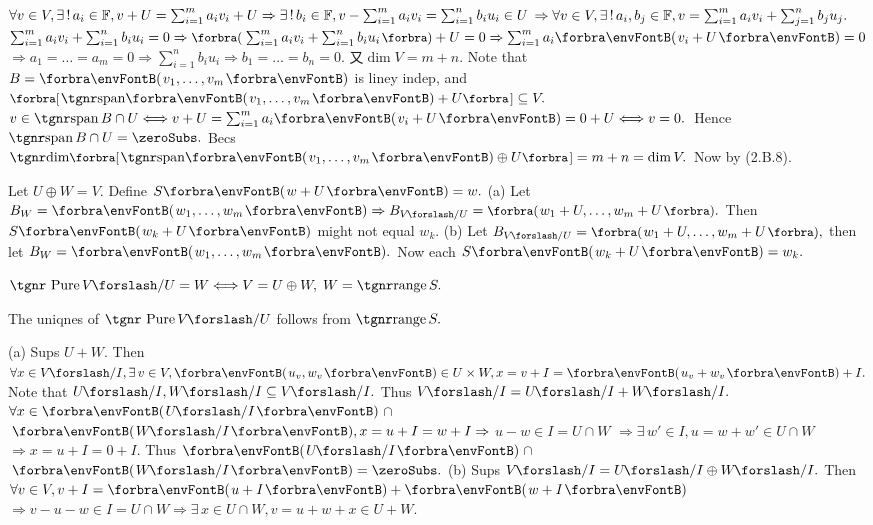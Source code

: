 $\forall v\in V,\exists\,!\,a_i\in{\mathbb{F}},v+U=\sum_{i=1}^m a_i v_i+U\Rightarrow\exists\,!\,b_i\in{\mathbb{F}},v-\sum_{i=1}^m a_i v_i=\sum_{i=1}^n b_i u_i\in U$\parSol{\vspace{1pt}}
$\Rightarrow \forall v\in V,\exists\,!\,a_i,b_j\in{\mathbb{F}},v=\sum_{i=1}^m a_i v_i+\sum_{j=1}^n b_j u_j.$\PfEnd\parSol{\vspace{4pt}}
\Or $\sum_{i=1}^m a_i v_i+\sum_{i=1}^n b_i u_i=0\Rightarrow\BigPar{\sum_{i=1}^m a_i v_i+\sum_{i=1}^n b_i u_i}+U=0\Rightarrow \sum_{i=1}^m a_i\Par{v_i+U}=0$\vspace{1pt}\parSol{}
\Blind{\Or}$\Rightarrow a_1=\dots=a_m=0\Rightarrow\sum_{i=1}^n b_i u_i\Rightarrow b_1=\dots=b_n=0.$ \;又$\dim V=m+n.$\PfEnd\parSol{\vspace{4pt}}
\Or Note that $B=\Par{v_1,\dots,v_m}$ is liney indep, and $\Sbra{\Span{v_1,\dots,v_m}+U}\subseteq V.$\parSol{}
$v\in\Spn B\cap U\Longleftrightarrow v+U=\sum_{i=1}^ma_i\Par{v_i+U}=0+U\Longleftrightarrow v=0.$ \,Hence $\Spn B\cap U=\zeroSubs.$\parSol{}
Becs $\Dim\Sbra{\Span{v_1,\dots,v_m}\oplus U}=m+n=\dim V.$ \;Now by (2.B.8).\PfEnd
\SepLine\pagebreak

\BulletPointX{}\;\;Let $U\oplus W=V.$ Define $S\Par{w+U}=w.$ \;\TextB{}
(a) Let $B_W=\Par{w_1,\dots,w_m}\Rightarrow B_{V\XSlash U}=\BigPar{w_1+U,\dots,w_m+U}.$ Then $S\Par{w_k+U}$ might not equal $w_k.$\TextB{}
(b) Let $B_{V\XSlash U}=\BigPar{w_1+U,\dots,w_m+U},$ then let $B_W=\Par{w_1,\dots,w_m}.$ Now each $S\Par{w_k+U}=w_k.$\def\Pure{{\textup{\tgnr Pure}}\,}\par\vspace{2pt}
\BulletPointX\NewNotation\;$\Pure V\XSlash U=W\Longleftrightarrow V=U\oplus W,\;W=\range S.$\par
\BulletPointX\NewTheorem\;The uniqnes of $\Pure V\XSlash U$ follows from $\range S.$
\SepLine

(a) Sups $U+W.$ Then $\forall x\in V\XSlash I,\exists\,v\in V,\Par{u_v,w_v}\in U\times W,x=v+I=\Par{u_v+w_v}+I.$\parSol{\Ha}
Note that $U\XSlash I,W\XSlash I\subseteq V\XSlash I.$ Thus $V\XSlash I=U\XSlash I+W\XSlash I.$\parSol{\Ha}
$\forall x\in\Par{U\XSlash I}\,${\Large$\cap$}$\,\Par{W\XSlash I},x=u+I=w+I\Rightarrow{}$\uline{$u-w\in I=U\cap W$}\parSol{\Ha}
\uline{$\Rightarrow\exists\,w'\in I,u=w+w'\in U\cap W$}${}\Rightarrow x=u+I=0+I.$ Thus $\Par{U\XSlash I}\,${\Large$\cap$}$\,\Par{W\XSlash I}=\zeroSubs.$\parSol{\vspace{2pt}}
(b) Sups $V\XSlash I=U\XSlash I\oplus W\XSlash I.$ Then $\forall v\in V,v+I=\Par{u+I}+\Par{w+I}$\parSol{\Hb}
$\Rightarrow v-u-w\in I=U\cap W\Rightarrow\exists\,x\in U\cap W,v=u+w+x\in U+W.$\PfEnd
\SepLine

